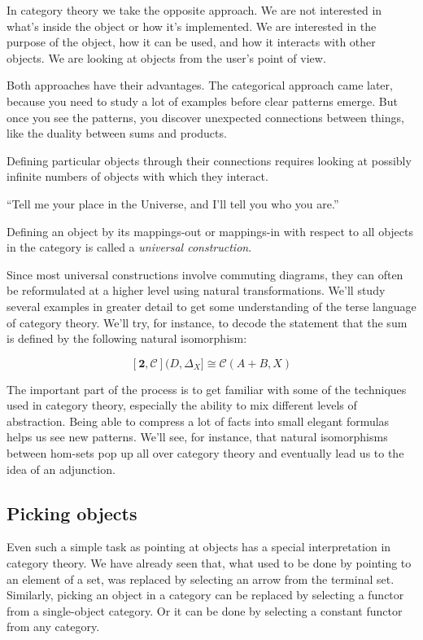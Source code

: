 \documentclass[DaoFP]{subfiles}
\begin{document}
In category theory we take the opposite approach. We are not interested in what's inside the object or how it's implemented. We are interested in the purpose of the object, how it can be used, and how it interacts with other objects. We are looking at objects from the user's point of view.

Both approaches have their advantages. The categorical approach came later, because you need to study a lot of examples before clear patterns emerge. But once you see the patterns, you discover unexpected connections between things, like the duality between sums and products.

Defining particular objects through their connections requires looking at possibly infinite numbers of objects with which they interact. 

``Tell me your place in the Universe, and I'll tell you who you are.''

Defining an object by its mappings-out or mappings-in with respect to all objects in the category is called a \emph{universal construction}. 

Since most universal constructions involve commuting diagrams, they can often be reformulated at a higher level using natural transformations. We'll study several examples in greater detail to get some understanding of the terse language of category theory. We'll try, for instance, to decode the statement that the sum is defined by the following natural isomorphism:

\[ [\mathbf{2}, \mathcal{C}](D, \Delta_X]  \cong \mathcal{C}(A + B, X) \]

The important part of the process is to get familiar with some of the techniques used in category theory, especially the ability to mix different levels of abstraction. Being able to compress a lot of facts into small elegant formulas helps us see new patterns. We'll see, for instance, that natural isomorphisms between hom-sets pop up all over category theory and eventually lead us to the idea of an adjunction.

\subsection{Picking objects}

Even such a simple task as pointing at objects has a special interpretation in category theory. We have already seen that, what used to be done by pointing to an element of a set, was replaced by selecting an arrow from the terminal set. Similarly, picking an object in a category can be replaced by selecting a functor from a single-object category. Or it can be done by selecting a constant functor from any category. 
\end{document}
